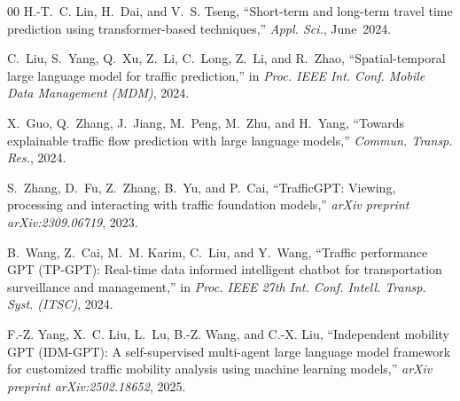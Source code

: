 \documentclass[conference]{IEEEtran}
\begin{document}
\begin{thebibliography}{00}
H.-T.~C. Lin, H.~Dai, and V.~S. Tseng, ``Short-term and long-term travel time prediction using transformer-based techniques,'' \textit{Appl. Sci.}, June~2024.

C.~Liu, S.~Yang, Q.~Xu, Z.~Li, C.~Long, Z.~Li, and R.~Zhao, ``Spatial-temporal large language model for traffic prediction,'' in \textit{Proc. IEEE Int. Conf. Mobile Data Management (MDM)}, 2024.

X.~Guo, Q.~Zhang, J.~Jiang, M.~Peng, M.~Zhu, and H.~Yang, ``Towards explainable traffic flow prediction with large language models,'' \textit{Commun. Transp. Res.}, 2024.

S.~Zhang, D.~Fu, Z.~Zhang, B.~Yu, and P.~Cai, ``TrafficGPT: Viewing, processing and interacting with traffic foundation models,'' \textit{arXiv preprint arXiv:2309.06719}, 2023.

B.~Wang, Z.~Cai, M.~M. Karim, C.~Liu, and Y.~Wang, ``Traffic performance GPT (TP-GPT): Real-time data informed intelligent chatbot for transportation surveillance and management,'' in \textit{Proc. IEEE 27th Int. Conf. Intell. Transp. Syst. (ITSC)}, 2024.

F.-Z. Yang, X.~C. Liu, L.~Lu, B.-Z. Wang, and C.-X. Liu, ``Independent mobility GPT (IDM-GPT): A self-supervised multi-agent large language model framework for customized traffic mobility analysis using machine learning models,'' \textit{arXiv preprint arXiv:2502.18652}, 2025.

\end{thebibliography}
\end{document}
